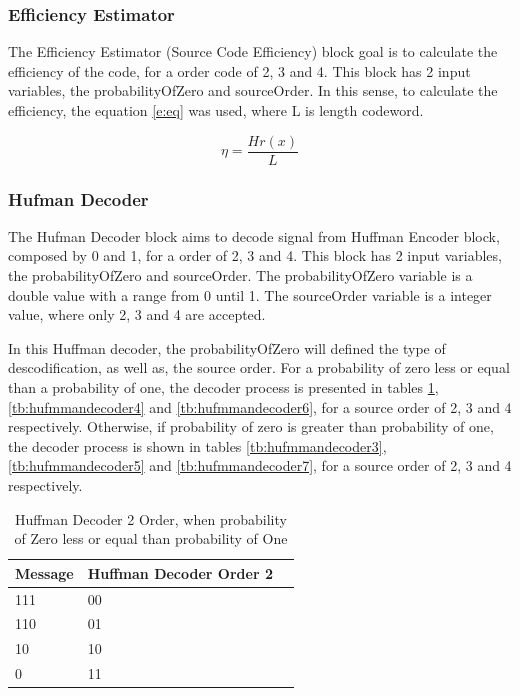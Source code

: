 \begin{refsection}
\subsubsection{Efficiency Estimator}
The Efficiency Estimator (Source Code Efficiency) block goal is to calculate the efficiency of the code, for a order code of 2, 3 and 4. This block has 2 input variables, the probabilityOfZero and sourceOrder.
In this sense, to calculate the efficiency, the equation \ref{e:eq} was used, where L is length codeword.

\begin{equation}
\eta=\frac{Hr(x)}{L}
 \label{e:eq}
\end{equation}

\subsubsection{Hufman Decoder}


The Hufman Decoder block aims to decode signal from Huffman Encoder block, composed by 0 and 1, for a order of 2, 3 and 4. This block has 2 input variables, the probabilityOfZero and sourceOrder.
The probabilityOfZero variable is a double value with a range from 0 until 1. The sourceOrder variable is a integer value, where only 2, 3 and 4 are accepted.

In this Huffman decoder, the probabilityOfZero will defined the type of descodification, as well as, the source order. For a probability of zero less or equal than a probability of one, the decoder process is presented in tables \ref{tb:hufmmandecoder2}, \ref{tb:hufmmandecoder4} and \ref{tb:hufmmandecoder6}, for a source order of 2, 3 and 4 respectively.
Otherwise, if probability of zero is greater than probability of one, the decoder process is shown in tables \ref{tb:hufmmandecoder3}, \ref{tb:hufmmandecoder5} and \ref{tb:hufmmandecoder7}, for a source order of 2, 3 and 4 respectively.


\begin{table}[H]
\centering
\caption{Huffman Decoder 2 Order, when probability of Zero less or equal than probability of One}
\label{tb:hufmmandecoder2}
\begin{tabular}{|l|l|l|}
\hline
\textbf{Message}                      & \textbf{Huffman Decoder Order 2}                                       \\ \hline
111              & 00                                               \\ \hline
110              & 01                                           \\ \hline
10                & 10                                      \\ \hline
0                  & 11                                  \\ \hline


\end{tabular}
\end{table}
\end{refsection}
